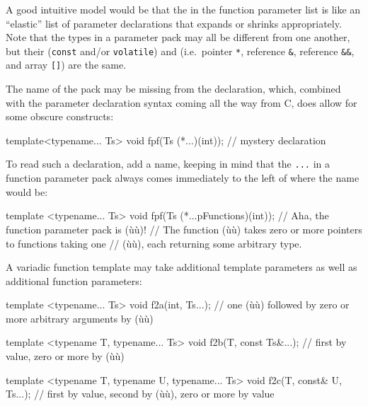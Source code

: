 \noindent A good intuitive model would be that the  in the
function parameter list is like an ``elastic'' list of parameter
declarations that expands or shrinks appropriately. Note that the types
in a parameter pack may all be different from one another, but their
 (\lstinline!const! and/or \lstinline!volatile!) and
 (i.e.~pointer \lstinline!*!, reference
\lstinline!&!,  reference \lstinline!&&!, and array \lstinline![]!) are
the same.

The name of the pack may be missing from the declaration, which,
combined with the parameter declaration syntax coming all the way from
C, does allow for some obscure constructs:

\begin{emcppslisting}
template<typename... Ts> void fpf(Ts (*...)(int));
    // mystery declaration
\end{emcppslisting}
    

\noindent To read such a declaration, add a name, keeping in mind that the
\lstinline!...! in a function parameter pack always comes immediately to
the left of where the name would be:

\begin{emcppslisting}
template <typename... Ts> void fpf(Ts (*...pFunctions)(int));
    // Aha, the function parameter pack is (ù{}ù)!
    // The function (ù{}ù) takes zero or more pointers to functions taking one
    // (ù{}ù), each returning some arbitrary type.
\end{emcppslisting}
    

\noindent A variadic function template may take additional template parameters as
well as additional function parameters:

\begin{emcppslisting}
template <typename... Ts> void f2a(int, Ts...);
    // one (ù{}ù) followed by zero or more arbitrary arguments by (ù{}ù)

template <typename T, typename... Ts> void f2b(T, const Ts&...);
    // first by value, zero or more by (ù{}ù)

template <typename T, typename U, typename... Ts> void f2c(T, const& U, Ts...);
    // first by value, second by (ù{}ù), zero or more by value
\end{emcppslisting}
    

